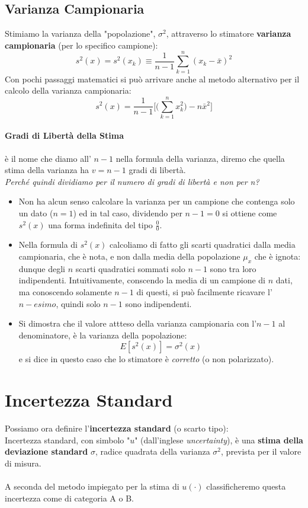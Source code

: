 \documentclass[a4paper,11pt]{report}
\begin{document}
\subsection{Varianza Campionaria}
Stimiamo la varianza della "popolazione", $\sigma^2$, attraverso lo stimatore \textbf{varianza campionaria} (per lo specifico campione):
$$
  s^2(x) = s^2(x_k) \equiv \frac{1}{n-1}\sum^{n}_{k=1}(x_k-\bar{x})^2
$$
Con pochi passaggi matematici si può arrivare anche al metodo alternativo per il calcolo della varianza campionaria:
$$
  s^2(x) = \frac{1}{n-1}\Bigg[\Bigg(\sum^{n}_{k=1}x^2_k\Bigg)-n\bar{x}^2\Bigg]
$$
\paragraph{Gradi di Libertà della Stima} è il nome che diamo all' $n-1$ nella formula della varianza, diremo che quella stima della varianza ha $v = n-1$ gradi di libertà.\\

\textit{Perché quindi dividiamo per il numero di gradi di libertà e non per n?}
\begin{itemize}
  \item Non ha alcun senso calcolare la varianza per un campione che contenga solo un dato ($n=1$) ed in tal caso, dividendo per $n-1 = 0$ si ottiene come $s^2(x)$ una forma indefinita del tipo $\frac{0}{0}$.
  \item Nella formula di $s^2(x)$ calcoliamo di fatto gli scarti quadratici dalla media campionaria, che è nota, e non dalla media della popolazione $\mu_x$ che è ignota: dunque degli $n$ scarti quadratici sommati solo $n-1$ sono tra loro indipendenti. Intuitivamente, conscendo la media di un campione di $n$ dati, ma conoscendo solamente $n-1$ di questi, si può facilmente ricavare l'$n-esimo$, quindi solo $n-1$ sono indipendenti.
  \item Si dimostra che il valore attteso della varianza campionaria con l'$n-1$ al denominatore, è la varianza della popolazione:
  $$
    E[s^2(x)] = \sigma^2(x)
  $$
  e si dice in questo caso che lo stimatore è \textit{corretto} (o non polarizzato).
\end{itemize}
\section{Incertezza Standard}
Possiamo ora definire l'\textbf{incertezza standard} (o scarto tipo):\\

Incertezza standard, con simbolo "$u$" (dall'inglese \textit{uncertainty}), è una \textbf{stima della deviazione standard} $\sigma$, radice quadrata della varianza $\sigma^2$, prevista per il valore di misura.\\ \\
A seconda del metodo impiegato per la stima di $u(\cdotp)$ classificheremo questa incertezza come di categoria A o B.
\end{document}
